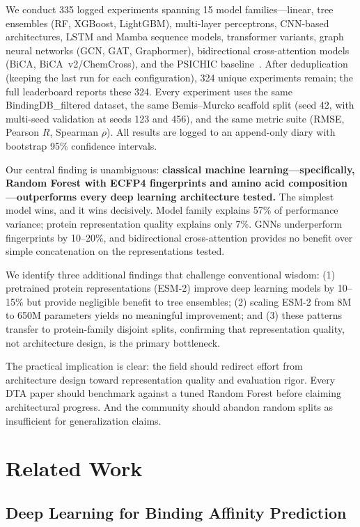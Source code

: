 \documentclass[11pt,twocolumn,a4paper]{article}
\begin{document}
We conduct 335 logged experiments spanning 15 model families---linear, tree ensembles (RF, XGBoost, LightGBM), multi-layer perceptrons, CNN-based architectures, LSTM and Mamba sequence models, transformer variants, graph neural networks (GCN, GAT, Graphormer), bidirectional cross-attention models (BiCA, BiCA~v2/ChemCross), and the PSICHIC baseline~\cite{hao2024psichic}. After deduplication (keeping the last run for each configuration), 324 unique experiments remain; the full leaderboard reports these 324. Every experiment uses the same BindingDB\_filtered dataset, the same Bemis--Murcko scaffold split (seed 42, with multi-seed validation at seeds 123 and 456), and the same metric suite (RMSE, Pearson $R$, Spearman $\rho$). All results are logged to an append-only diary with bootstrap 95\% confidence intervals.

Our central finding is unambiguous: \textbf{classical machine learning---specifically, Random Forest with ECFP4 fingerprints and amino acid composition---outperforms every deep learning architecture tested.} The simplest model wins, and it wins decisively. Model family explains 57\% of performance variance; protein representation quality explains only 7\%. GNNs underperform fingerprints by 10--20\%, and bidirectional cross-attention provides no benefit over simple concatenation on the representations tested.

We identify three additional findings that challenge conventional wisdom: (1) pretrained protein representations (ESM-2) improve deep learning models by 10--15\% but provide negligible benefit to tree ensembles; (2) scaling ESM-2 from 8M to 650M parameters yields no meaningful improvement; and (3) these patterns transfer to protein-family disjoint splits, confirming that representation quality, not architecture design, is the primary bottleneck.

The practical implication is clear: the field should redirect effort from architecture design toward representation quality and evaluation rigor. Every DTA paper should benchmark against a tuned Random Forest before claiming architectural progress. And the community should abandon random splits as insufficient for generalization claims.

\section{Related Work}

\subsection{Deep Learning for Binding Affinity Prediction}
\end{document}
